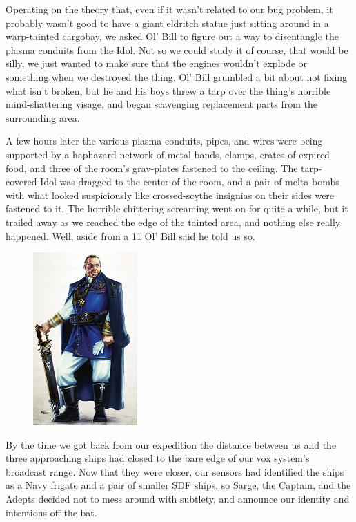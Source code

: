 Operating on the theory that, even if it wasn't related to our bug problem, it probably wasn't good to have a giant eldritch statue just sitting around in a warp-tainted cargobay, we asked Ol' Bill to figure out a way to disentangle the plasma conduits from the Idol. 
Not so we could study it of course, that would be silly, we just wanted to make sure that the engines wouldn't explode or something when we destroyed the thing. 
Ol' Bill grumbled a bit about not fixing what isn't broken, but he and his boys threw a tarp over the thing's horrible mind-shattering visage, and began scavenging replacement parts from the surrounding area.

A few hours later the various plasma conduits, pipes, and wires were being supported by a haphazard network of metal bands, clamps, crates of expired food, and three of the room's grav-plates fastened to the ceiling. 
The tarp-covered Idol was dragged to the center of the room, and a pair of melta-bombs with what looked suspiciously like crossed-scythe insignias on their sides were fastened to it. 
The horrible chittering screaming went on for quite a while, but it trailed away as we reached the edge of the tainted area, and nothing else really happened. 
Well, aside from a 11%
Ol' Bill said he told us so.

\begin{figure}
	\begin{center}
		\includegraphics[width=\figwidth]{pics/15/24.png}
	\end{center}
\end{figure}
By the time we got back from our expedition the distance between us and the three approaching ships had closed to the bare edge of our vox system's broadcast range. 
Now that they were closer, our sensors had identified the ships as a Navy frigate and a pair of smaller SDF ships, so Sarge, the Captain, and the Adepts decided not to mess around with subtlety, and announce our identity and intentions off the bat.


